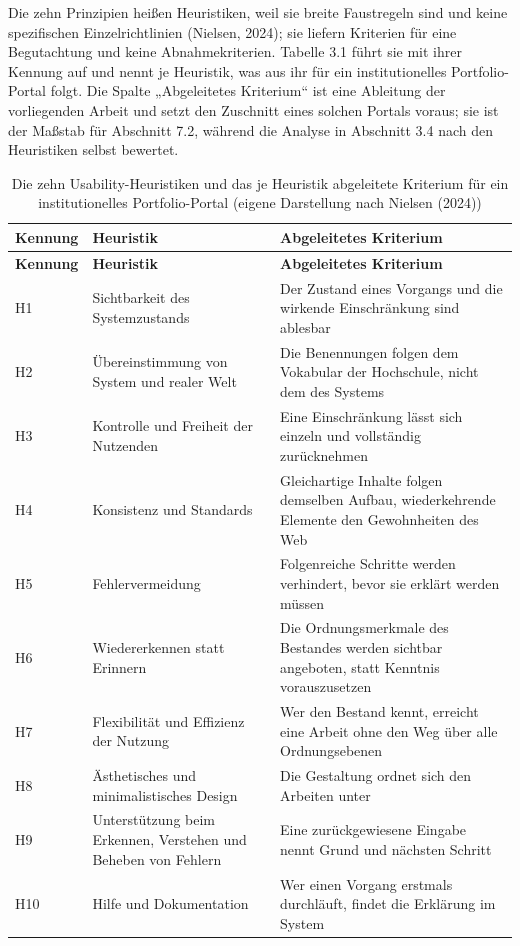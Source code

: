 Die zehn Prinzipien heißen Heuristiken, weil sie breite Faustregeln sind und keine spezifischen Einzelrichtlinien (Nielsen, 2024); sie liefern Kriterien für eine Begutachtung und keine Abnahmekriterien. Tabelle 3.1 führt sie mit ihrer Kennung auf und nennt je Heuristik, was aus ihr für ein institutionelles Portfolio-Portal folgt. Die Spalte „Abgeleitetes Kriterium“ ist eine Ableitung der vorliegenden Arbeit und setzt den Zuschnitt eines solchen Portals voraus; sie ist der Maßstab für Abschnitt 7.2, während die Analyse in Abschnitt 3.4 nach den Heuristiken selbst bewertet.

\begingroup
\small
\setlength{\tabcolsep}{4pt}
\begin{longtable}{@{}L{1.7cm}L{4.4cm}L{8.3cm}@{}}
	\caption[Die zehn Usability-Heuristiken und das abgeleitete Kriterium]{Die zehn Usability-Heuristiken und das je Heuristik abgeleitete Kriterium für ein institutionelles Portfolio-Portal (eigene Darstellung nach Nielsen (2024))}
	\label{tab:heuristiken}\\
	\toprule
	\textbf{Kennung} & \textbf{Heuristik} & \textbf{Abgeleitetes Kriterium} \\
	\midrule
	\endfirsthead
	\toprule
	\textbf{Kennung} & \textbf{Heuristik} & \textbf{Abgeleitetes Kriterium} \\
	\midrule
	\endhead
	\bottomrule
	\endfoot
	H1 & Sichtbarkeit des Systemzustands & Der Zustand eines Vorgangs und die wirkende Einschränkung sind ablesbar \\
	H2 & Übereinstimmung von System und realer Welt & Die Benennungen folgen dem Vokabular der Hochschule, nicht dem des Systems \\
	H3 & Kontrolle und Freiheit der Nutzenden & Eine Einschränkung lässt sich einzeln und vollständig zurücknehmen \\
	H4 & Konsistenz und Standards & Gleichartige Inhalte folgen demselben Aufbau, wiederkehrende Elemente den Gewohnheiten des Web \\
	H5 & Fehlervermeidung & Folgenreiche Schritte werden verhindert, bevor sie erklärt werden müssen \\
	H6 & Wiedererkennen statt Erinnern & Die Ordnungsmerkmale des Bestandes werden sichtbar angeboten, statt Kenntnis vorauszusetzen \\
	H7 & Flexibilität und Effizienz der Nutzung & Wer den Bestand kennt, erreicht eine Arbeit ohne den Weg über alle Ordnungsebenen \\
	H8 & Ästhetisches und minimalistisches Design & Die Gestaltung ordnet sich den Arbeiten unter \\
	H9 & Unterstützung beim Erkennen, Verstehen und Beheben von Fehlern & Eine zurückgewiesene Eingabe nennt Grund und nächsten Schritt \\
	H10 & Hilfe und Dokumentation & Wer einen Vorgang erstmals durchläuft, findet die Erklärung im System \\
\end{longtable}
\endgroup

